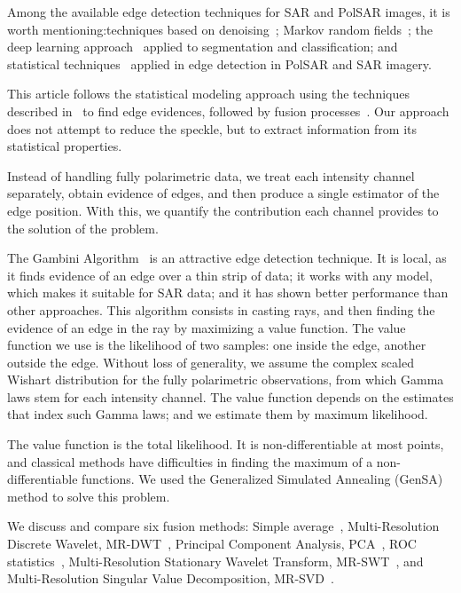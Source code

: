 \documentclass[journal]{IEEEtran}
\begin{document}
Among the available edge detection techniques for SAR and PolSAR images, it is worth mentioning:techniques based on denoising~\cite{sjx, lzly, wxbzw, law, cgaf};   
Markov random fields~\cite{bf};	
the deep learning approach~\cite{bac, ztmxzxf} applied to segmentation and classification; and
statistical techniques~\cite{gmbf, fbgm, nhfc} applied in edge detection in PolSAR and SAR imagery.


This article follows the statistical modeling approach using the techniques described in~\cite{gmbf, fbgm, nhfc} to find edge evidences, followed by fusion processes~\cite{mit, bmf_2019}. 
Our approach does not attempt to reduce the speckle, but to extract information from its statistical properties.

Instead of handling fully polarimetric data, we treat each intensity channel separately, obtain evidence of edges, and then produce a single estimator of the edge position.
With this, we quantify the contribution each channel provides to the solution of the problem.

The Gambini Algorithm~\cite{gmbf_sc} is an attractive edge detection technique.
It is local, as it finds evidence of an edge over a thin strip of data; 
it works with any model, which makes it suitable for SAR data; 
and it has shown better performance than other approaches.
This algorithm consists in casting rays, and then finding the evidence of an edge in the ray by maximizing a value function.
The value function we use is the likelihood of two samples: one inside the edge, another outside the edge.
Without loss of generality, we assume the complex scaled Wishart distribution for the fully polarimetric observations, from which Gamma laws stem for each intensity channel.
The value function depends on the estimates that index such Gamma laws; and
we estimate them by maximum likelihood.

The value function is the total likelihood.
It is non-differentiable at most points, and classical methods have difficulties in finding the maximum of a non-differentiable functions. 
We used the Generalized Simulated Annealing (GenSA)~\cite{xgsh} method to solve this problem. 

We discuss and compare six fusion methods:
Simple average~\cite{mit}, 
Multi-Resolution Discrete Wavelet, MR-DWT~\cite{n_r},
Principal Component Analysis, PCA~\cite{n_r,mit},
ROC statistics~\cite{gs},
Multi-Resolution Stationary Wavelet Transform, MR-SWT~\cite{n_r, jjly}, and 
Multi-Resolution Singular Value Decomposition, MR-SVD~\cite{naidu}.
\end{document}
